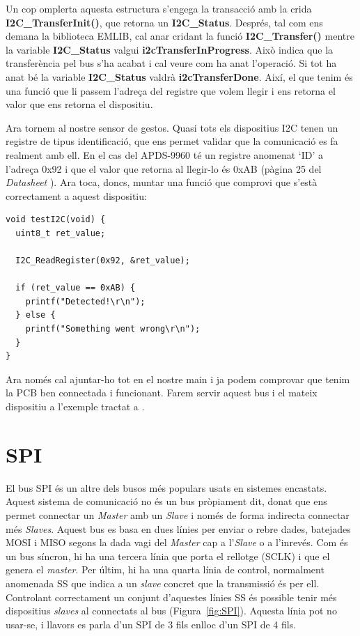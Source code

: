 Un cop omplerta aquesta estructura s'engega la transacció amb la crida {\bf I2C\_TransferInit()}, que retorna un {\bf I2C\_Status}. Després, tal com ens demana la biblioteca EMLIB, cal anar cridant la funció {\bf I2C\_Transfer()} mentre la variable {\bf I2C\_Status} valgui {\bf i2cTransferInProgress}. Això indica que la transferència pel bus s'ha acabat i cal veure com ha anat l'operació. Si tot ha anat bé la variable {\bf I2C\_Status} valdrà {\bf i2cTransferDone}. Així, el que tenim és una funció que li passem l'adreça del registre que volem llegir i ens retorna el valor que ens retorna el dispositiu.

Ara tornem al nostre sensor de gestos. Quasi tots els dispositius I2C tenen un registre de tipus identificació, que ens permet validar que la comunicació es fa realment amb ell. En el cas del APDS-9960 té un registre anomenat ‘ID' a l'adreça 0x92 i que el valor que retorna al llegir-lo és 0xAB (pàgina 25 del {\em Datasheet} \cite{apds9960}). Ara toca, doncs, muntar una funció que comprovi que s'està correctament a aquest dispositiu:

\begin{lstlisting}[style=customc,caption=Funció {\bf testI2C()},label=testI2C]
void testI2C(void) {
  uint8_t ret_value;

  I2C_ReadRegister(0x92, &ret_value);

  if (ret_value == 0xAB) {
    printf("Detected!\r\n");
  } else {
    printf("Something went wrong\r\n");
  }
}
\end{lstlisting}

Ara només cal ajuntar-ho tot en el nostre main i ja podem comprovar que tenim la PCB ben connectada i funcionant. Farem servir aquest bus i el mateix dispositiu a l'exemple tractat a .


\chapter{SPI}
\label{sub:SPI}
El bus \gls{SPI} és un altre dels busos més populars usats en sistemes encastats. Aquest sistema de comunicació no és un bus pròpiament dit, donat que ens permet connectar un {\em Master} amb un {\em Slave} i només de forma indirecta connectar més {\em Slaves}.
Aquest bus es basa en dues línies per enviar o rebre dades, batejades \gls{MOSI} i \gls{MISO} segons la dada vagi del {\em Master} cap a l'{\em Slave} o a l'inrevés. Com és un bus síncron, hi ha una tercera línia que porta el rellotge (\gls{SCLK}) i que el genera el {\em master}. Per últim, hi ha una quarta línia de control, normalment anomenada \gls{SS} que indica a un {\em slave} concret que la transmissió és per ell. Controlant correctament un conjunt d'aquestes línies \gls{SS} és possible tenir més dispositius {\em slaves} al connectats al bus (Figura~\ref{fig:SPI}). Aquesta línia pot no usar-se, i llavors es parla d'un SPI de 3 fils enlloc d'un SPI de 4 fils.


